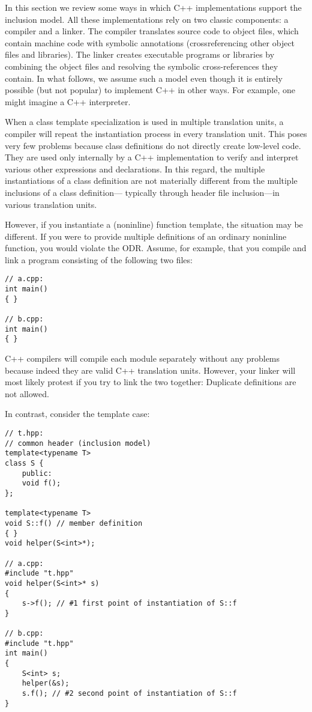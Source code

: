 
In this section we review some ways in which C++ implementations support the inclusion model. All these implementations rely on two classic components: a compiler and a linker. The compiler translates source code to object files, which contain machine code with symbolic annotations (crossreferencing other object files and libraries). The linker creates executable programs or libraries by combining the object files and resolving the symbolic cross-references they contain. In what follows, we assume such a model even though it is entirely possible (but not popular) to implement C++ in other ways. For example, one might imagine a C++ interpreter.

When a class template specialization is used in multiple translation units, a compiler will repeat the instantiation process in every translation unit. This poses very few problems because class definitions do not directly create low-level code. They are used only internally by a C++ implementation to verify and interpret various other expressions and declarations. In this regard, the multiple instantiations of a class definition are not materially different from the multiple inclusions of a class definition— typically through header file inclusion—in various translation units.

However, if you instantiate a (noninline) function template, the situation may be different. If you were to provide multiple definitions of an ordinary noninline function, you would violate the ODR. Assume, for example, that you compile and link a program consisting of the following two files:

\begin{lstlisting}[style=styleCXX]
// a.cpp:
int main()
{ }

// b.cpp:
int main()
{ }
\end{lstlisting}

C++ compilers will compile each module separately without any problems because indeed they are valid C++ translation units. However, your linker will most likely protest if you try to link the two together: Duplicate definitions are not allowed.

In contrast, consider the template case:

\begin{lstlisting}[style=styleCXX]
// t.hpp:
// common header (inclusion model)
template<typename T>
class S {
	public:
	void f();
};

template<typename T>
void S::f() // member definition
{ }
void helper(S<int>*);

// a.cpp:
#include "t.hpp"
void helper(S<int>* s)
{
	s->f(); // #1 first point of instantiation of S::f
}

// b.cpp:
#include "t.hpp"
int main()
{
	S<int> s;
	helper(&s);
	s.f(); // #2 second point of instantiation of S::f
}
\end{lstlisting}

